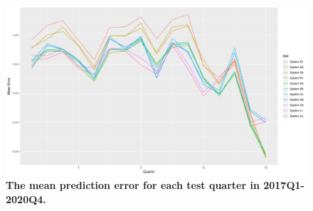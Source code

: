 \begin{figure}[ht]
\begin{center}
\includegraphics[scale=0.4]{./images/mean_error_16windows}
\caption{{\bf The mean prediction error for each test quarter in 2017Q1-2020Q4.}\setlength{\baselineskip}{1.25em}}
\label{fig_errors_mean_error}
\end{center}
\end{figure}